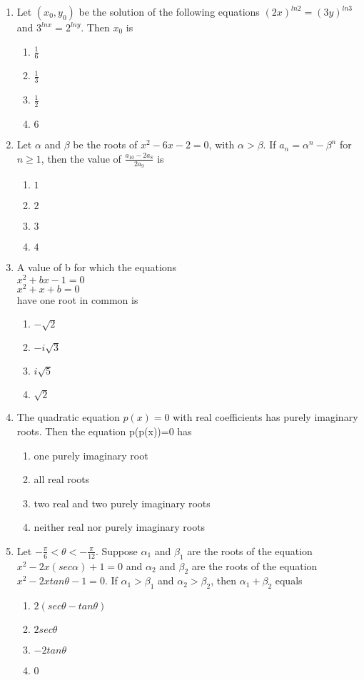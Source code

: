 \begin{enumerate}[label=\arabic*.,ref=\thesubsection.\theenumi]
\item Let $(x_0,y_0)$ be the solution of the following equations $(2x)^{ln2}=(3y)^{ln3}$ and $3^{lnx}=2^{lny}$. Then $x_0$ is
\begin{enumerate}
\item $\frac{1}{6}$
\item $\frac{1}{3}$
\item $\frac{1}{2}$
\item $6$ 
\end{enumerate}

\item Let $\alpha$ and $\beta$ be the roots of $x^{2}-6x-2=0$, with $\alpha>\beta$. If $a_n=\alpha^{n}-\beta^{n}$ for $n\geq1$, then the value of $\frac{a_{10}-2a_{8}}{2a_{9}}$ is
\begin{enumerate}
\item $1$
\item $2$ 
\item $3$
\item $4$ 
\end{enumerate}

\item A value of b for which the equations\\
$x^{2}+bx-1=0$\\
$x^{2}+x+b=0$\\
have one root in common is 
\begin{enumerate}
\item $-\sqrt2$
\item $-i\sqrt3$ 
\item $i\sqrt5$
\item $\sqrt2$ 
\end{enumerate}

\item The quadratic equation $p(x)=0$ with real coefficients has purely imaginary roots. Then the equation p(p(x))=0 has
\begin{enumerate}
\item one purely imaginary root
\item all real roots
\item two real and two purely imaginary roots
\item neither real nor purely imaginary roots
\end{enumerate}

\item Let $-\frac{\pi}{6}<\theta<-\frac{\pi}{12}$. Suppose $\alpha_1$ and $\beta_1$ are the roots of the equation $x^{2}-2x (sec\alpha) +1=0$ and $\alpha_2$ and $\beta_2$ are the roots of the equation $x^{2}-2x tan\theta-1=0$. If $\alpha_1>\beta_1$ and $\alpha_2>\beta_2$, then $\alpha_1+\beta_2$ equals 
\begin{enumerate}
\item $2(sec\theta-tan\theta)$
\item $2sec\theta$ 
\item $-2tan\theta$
\item $0$ 
\end{enumerate}


\end{enumerate}
